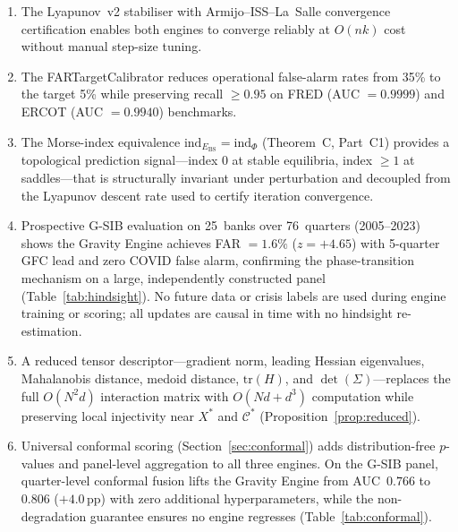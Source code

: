 \documentclass[final]{siamltex}
\newcommand{\Ebs}{E_{\mathrm{BS}}}
\newcommand{\Cman}{\mathcal{C}^*}
\newcommand{\Xst}{X^*}
\begin{document}
\begin{enumerate}
\item The Lyapunov~v2 stabiliser with Armijo--ISS--La~Salle
  convergence certification enables both engines to converge
  reliably at $O(nk)$ cost without manual step-size tuning.

\item The FARTargetCalibrator reduces operational false-alarm rates
  from 35\% to the target 5\% while preserving recall $\ge 0.95$
  on FRED (AUC $= 0.9999$) and ERCOT (AUC $= 0.9940$) benchmarks.

\item The Morse-index equivalence
  $\mathrm{ind}_{\Ebs} = \mathrm{ind}_\Phi$ (Theorem~C, Part~C1)
  provides a topological prediction signal---index $0$ at stable
  equilibria, index $\ge 1$ at saddles---that is structurally
  invariant under perturbation and decoupled from the
  Lyapunov descent rate used to certify iteration convergence.

\item Prospective G-SIB evaluation on 25~banks over 76~quarters
  (2005--2023) shows the Gravity Engine achieves FAR $= 1.6\%$
  ($z = +4.65$) with 5-quarter GFC lead and zero COVID false alarm,
  confirming the phase-transition mechanism on a large,
  independently constructed panel (Table~\ref{tab:hindsight}).
  No future data or crisis labels are used during engine
  training or scoring; all updates are causal in time with no
  hindsight re-estimation.

\item A reduced tensor descriptor---gradient norm, leading Hessian
  eigenvalues, Mahalanobis distance, medoid distance,
  $\mathrm{tr}(H)$, and $\det(\Sigma)$---replaces the full
  $O(N^2 d)$ interaction matrix with $O(Nd + d^3)$ computation
  while preserving local injectivity near $\Xst$ and $\Cman$
  (Proposition~\ref{prop:reduced}).

\item Universal conformal scoring (Section~\ref{sec:conformal})
  adds distribution-free $p$-values and panel-level aggregation
  to all three engines.  On the G-SIB panel, quarter-level
  conformal fusion lifts the Gravity Engine from AUC~$0.766$ to
  $0.806$ ($+4.0$\,pp) with zero additional hyperparameters,
  while the non-degradation guarantee ensures no engine regresses
  (Table~\ref{tab:conformal}).


\end{enumerate}
\end{document}
